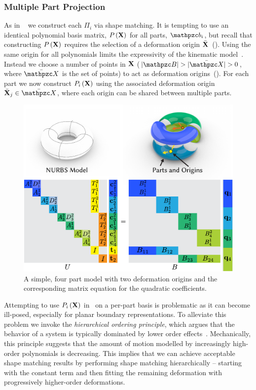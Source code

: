  \subsubsection*{Multiple Part Projection}
As in ~ we construct each $\Pi_i$ via shape matching. 
It is tempting to use an identical polynomial basis matrix, $P\left(\mathbf{X}\right)$ for all parts, $\prt_i$, but recall that constructing $P\left(\mathbf{X}\right)$ requires the selection of a deformation
origin $\bar{\mathbf{X}}$~(). 
Using the same origin for all polynomials limits the expressivity of the kinematic model~\cite{STBS:2011}.
Instead we choose a number of points in $\mathbf{X}$ ($|\Prts| > |\XBs| > 0$, where $\XBs$ is the set of points)  to act as deformation origins~().
For each part we now construct $P_i\left(\mathbf{X} \right)$ using the associated deformation origin $\bar{\refX}_j\in \XBs$, where each origin can
be shared between multiple parts.

\begin{figure}[h]
    \includegraphics[width=\columnwidth]{figures/projection_operator_solve}
    \caption{A simple, four part model with two deformation origins and the corresponding matrix equation for the quadratic coefficients.}
    \label{fig:multiparts}
\end{figure}


Attempting to use $P_i\left(\mathbf{X} \right)$ in~ on a per-part basis is problematic as it can become ill-posed, especially for planar boundary representations. 
To alleviate this problem we invoke the \emph{hierarchical ordering principle}, which argues that the behavior of a system is typically 
dominated by lower order effects~\cite{li2006regularities}. 
Mechanically, this principle suggests that the amount of motion modelled by increasingly high-order polynomials is decreasing. 
This implies that we can achieve acceptable shape matching results by performing shape matching hierarchically -- starting with the constant term and then 
fitting the remaining deformation with progressively higher-order deformations. 


